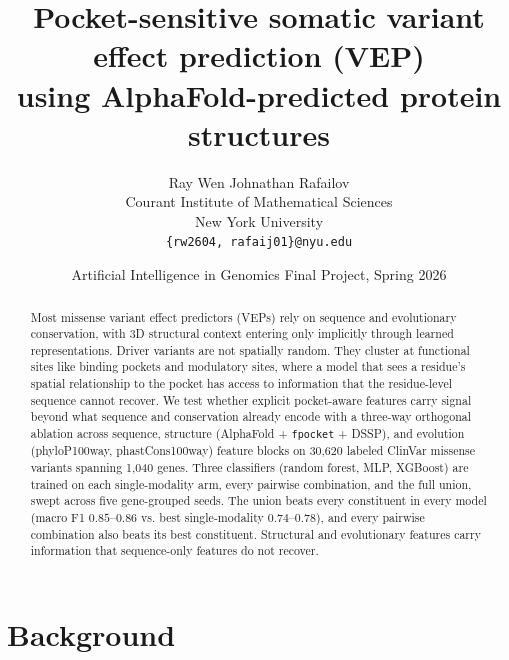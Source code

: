 \documentclass{article}
\title{Pocket-sensitive somatic variant effect prediction (VEP)\\
  using AlphaFold-predicted protein structures}
\author{%
  Ray Wen \quad Johnathan Rafailov \\
  Courant Institute of Mathematical Sciences \\
  New York University \\
  \texttt{\{rw2604, rafaij01\}@nyu.edu}
}
\date{Artificial Intelligence in Genomics Final Project, Spring 2026}
\begin{document}
\maketitle

\begin{abstract}
Most missense variant effect predictors (VEPs) rely on sequence and
evolutionary conservation, with 3D structural context entering only
implicitly through learned representations. Driver variants are not spatially random. They cluster at functional
sites like binding pockets and modulatory sites, where a model that
sees a residue's spatial relationship to the pocket has access to
information that the residue-level sequence cannot recover. We test whether
explicit pocket-aware features carry signal beyond what sequence and
conservation already encode with a three-way orthogonal ablation across
sequence, structure (AlphaFold + \texttt{fpocket} + DSSP), and
evolution (phyloP100way, phastCons100way) feature blocks on 30{,}620
labeled ClinVar missense variants spanning 1{,}040 genes. Three
classifiers (random forest, MLP, XGBoost) are trained on each
single-modality arm, every pairwise combination, and the full union, swept
across five gene-grouped seeds. The union beats every constituent in
every model (macro F1 $0.85$--$0.86$ vs. best single-modality
$0.74$--$0.78$), and every pairwise combination also beats its best
constituent. Structural and evolutionary features carry information
that sequence-only features do not recover.
\end{abstract}

\section{Background}
\label{sec:background}
\end{document}
